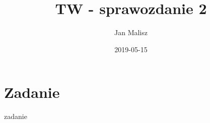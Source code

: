 \documentclass[10pt,a4paper]{article}
\title{TW - sprawozdanie 2}
\author{Jan Malisz}
\date{2019-05-15}
\begin{document}
  \maketitle
  \thispagestyle{empty}
  \newpage

  \section*{Zadanie}\label{sec:Zadanie}
  {zadanie}
\end{document}
